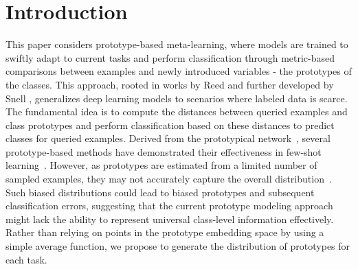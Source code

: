 \section{Introduction}

This paper considers prototype-based meta-learning, where models are trained to swiftly adapt to current tasks and perform classification through metric-based comparisons between examples and newly introduced variables - the prototypes of the classes. This approach, rooted in works by Reed \cite{reed1972pattern} and further developed by Snell \etal \cite{snell2017prototypical}, generalizes deep learning models to scenarios where labeled data is scarce. The fundamental idea is to compute the distances between queried examples and class prototypes and perform classification based on these distances to predict classes for queried examples. Derived from the prototypical network~\cite{snell2017prototypical}, several prototype-based methods have demonstrated their effectiveness in few-shot learning~\cite{ allen2019infinite, zhen2020memory, du2021hierarchical, ding2021prototypical}. However, as prototypes are estimated from a limited number of sampled examples, they may not accurately capture the overall distribution~\cite{yang2021free, zhen2020memory}. Such biased distributions could lead to biased prototypes and subsequent classification errors, suggesting that the current prototype modeling approach might lack the ability to represent universal class-level information effectively.  Rather than relying on points in the prototype embedding space by using a simple average function, we propose to generate the distribution of prototypes for each task.



